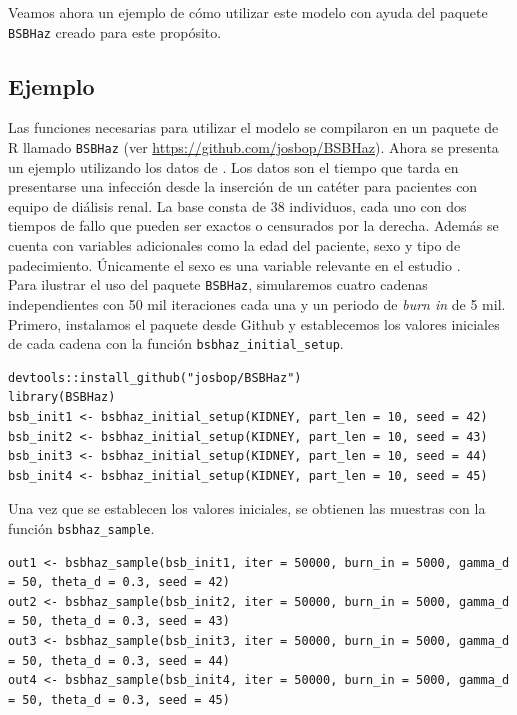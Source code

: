 \documentclass[11pt,a4paper]{article}
\begin{document}
Veamos ahora un ejemplo de cómo utilizar este modelo con ayuda del paquete \texttt{BSBHaz} creado para este propósito.

\subsection{Ejemplo}
\label{sec:ejemplo}
Las funciones necesarias para utilizar el modelo se compilaron en un paquete de R llamado \texttt{BSBHaz} (ver \url{https://github.com/josbop/BSBHaz}). Ahora se presenta un ejemplo utilizando los datos de \citet{kidney}. Los datos son el tiempo que tarda en presentarse una infección desde la inserción de un catéter para pacientes con equipo de diálisis renal. La base consta de 38 individuos, cada uno con dos tiempos de fallo que pueden ser exactos o censurados por la derecha. Además se cuenta con variables adicionales como la edad del paciente, sexo y tipo de padecimiento. Únicamente el sexo es una variable relevante en el estudio \citep{nieto}.\\

Para ilustrar el uso del paquete \texttt{BSBHaz}, simularemos cuatro cadenas independientes con 50 mil iteraciones cada una y un periodo de \textit{burn in} de 5 mil. Primero, instalamos el paquete desde Github y establecemos los valores iniciales de cada cadena con la función \texttt{bsbhaz\_initial\_setup}.\\

\begin{lstlisting}
devtools::install_github("josbop/BSBHaz")
library(BSBHaz)
bsb_init1 <- bsbhaz_initial_setup(KIDNEY, part_len = 10, seed = 42)
bsb_init2 <- bsbhaz_initial_setup(KIDNEY, part_len = 10, seed = 43)
bsb_init3 <- bsbhaz_initial_setup(KIDNEY, part_len = 10, seed = 44)
bsb_init4 <- bsbhaz_initial_setup(KIDNEY, part_len = 10, seed = 45)
\end{lstlisting}

Una vez que se establecen los valores iniciales, se obtienen las muestras con la función \texttt{bsbhaz\_sample}.\\

\begin{lstlisting}
out1 <- bsbhaz_sample(bsb_init1, iter = 50000, burn_in = 5000, gamma_d = 50, theta_d = 0.3, seed = 42)
out2 <- bsbhaz_sample(bsb_init2, iter = 50000, burn_in = 5000, gamma_d = 50, theta_d = 0.3, seed = 43)
out3 <- bsbhaz_sample(bsb_init3, iter = 50000, burn_in = 5000, gamma_d = 50, theta_d = 0.3, seed = 44)
out4 <- bsbhaz_sample(bsb_init4, iter = 50000, burn_in = 5000, gamma_d = 50, theta_d = 0.3, seed = 45)
\end{lstlisting}
\end{document}
